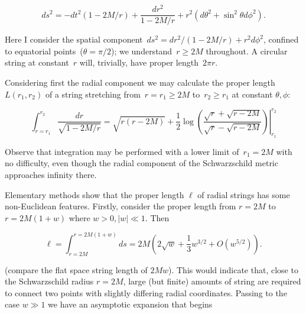 \documentclass{ws-tpe}
\begin{document}
\begin{equation}\label{schwarzschild}
ds^2= -dt^2\left(1-2M/r\right) +\frac{dr^2}{1-2M/r} + r^2\left(d\theta^2 + \sin^2\theta d\phi^2\right).
\end{equation}

\noindent Here I consider the spatial component~$ds^2=
dr^2/\left(1-2M/r\right) + r^2d\phi^2$, confined to equatorial
points~($\theta=\pi/2$); we understand~$r\geqslant 2M$ throughout.  A
circular string at constant~$r$ will, trivially, have proper
length~$2\pi r$.

Considering first the radial component we may calculate the
proper length $L\left(r_1,r_2\right)$ of a string stretching
from~$r=r_1\geqslant 2M$ to~$r_2\geqslant r_1$ at constant $\theta,\phi$:



\begin{equation}\label{radial_string_length}
  \int_{r=r_1}^{r_2}\frac{dr}{\sqrt{1-2M/r}}=
  \left.
  \sqrt{r(r-2M)} +\frac{1}{2}\log\left(
  \frac{\sqrt{r}+\sqrt{r-2M}}{\sqrt{r}-\sqrt{r-2M}}\right)
  \right|_{r_1}^{r_2}
  \end{equation}

Observe that integration may be performed with a lower limit
of~$r_1=2M$ with no difficulty, even though the radial component of the
Schwarzschild metric approaches infinity there.

Elementary methods show that the proper length $\ell$ of radial
strings has some non-Euclidean features.  Firstly, consider the proper
length from $r=2M$ to $r=2M(1+w)$ where $w>0, \left|w\right|\ll 1$.
Then


 \begin{equation}\label{ell}
   \ell =
   \int_{r=2M}^{r=2M(1+w)}ds
   =2M\left(2\sqrt{w} + \frac{1}{3}w^{3/2} + O(w^{5/2})\right).
 \end{equation}

(compare the flat space string length of $2Mw$).  This would indicate
 that, close to the Schwarzschild radius $r=2M$, large (but finite)
 amounts of string are required to connect two points with slightly
 differing radial coordinates.  Passing to the case $w\gg 1$ we have
 an asymptotic expansion that begins
\end{document}
